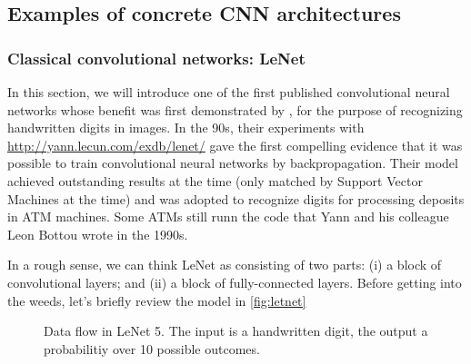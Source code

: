 
\subsection{Examples of concrete CNN architectures}

\subsubsection{Classical convolutional networks: LeNet}

In this section, we will introduce one of the first published convolutional neural networks whose benefit was first demonstrated by  \citet{Lecun1998}, for the purpose of recognizing handwritten digits in images. In the 90s, their experiments with \href{LeNet}{http://yann.lecun.com/exdb/lenet/} gave the first compelling evidence that it was possible to train convolutional neural networks by backpropagation. Their model achieved outstanding results at the time (only matched by Support Vector Machines at the time) and was adopted to recognize digits for processing deposits in ATM machines. Some ATMs still runn the code that Yann and his colleague Leon Bottou wrote in the 1990s.

In a rough sense, we can think LeNet as consisting of two parts: (i) a block of convolutional layers; and (ii) a block of fully-connected layers. Before getting into the weeds, let’s briefly review the model in \cref{fig:letnet}

\begin{figure}[hpt]
	\centering
	
	\caption{Data flow in LeNet 5. The input is a handwritten digit, the output a probabilitiy over 10 possible outcomes.}
	\label{fig:lenet}
\end{figure}

